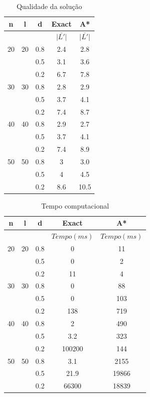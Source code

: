 \documentclass[12pt]{article}
\begin{document}
		\begin{multicols}{2}
			\begin {table}[H]
				\begin{tabular}{c|c|c|c|c} \hline
					n & l & d & Exact & A* \\ \hline
					& & & $\bar{|L'|}$ & $\bar{|L'|}$ \\ \hline
					20 & 20 & 0.8 & 2.4 & 2.8\\
					 &  & 0.5 & 3.1 & 3.6\\
					 &  & 0.2 & 6.7 & 7.8\\ \hline
					30 & 30 & 0.8 & 2.8 & 2.9 \\
					 &  & 0.5 & 3.7 & 4.1\\
					 &  & 0.2 & 7.4 & 8.7\\ \hline
					40 & 40 & 0.8 & 2.9 & 2.7\\
					 &  & 0.5 & 3.7 & 4.1\\
					 &  & 0.2 & 7.4 & 8.9\\ \hline
					50 & 50 & 0.8 & 3 & 3.0\\
					 &  & 0.5 & 4 & 4.5\\
					 &  & 0.2 & 8.6 & 10.5\\ \hline
				
				\end{tabular}
				\caption {Qualidade da solução}
			\end {table}
			
			\begin {table}[H]
	
				\begin{tabular}{c|c|c|c|c} \hline
					n & l & d & Exact & A* \\ \hline
					& & & $Tempo(ms)$ & $Tempo(ms)$\\ \hline
					20 & 20 & 0.8 &  0 & 11\\
					   &    & 0.5 &  0 & 2\\
					   &    & 0.2 & 11 & 4\\ \hline
					30 & 30 & 0.8 &  0 & 88 \\
					   &    & 0.5 &  0 & 103\\
					   &    & 0.2 & 138 & 719\\ \hline
					40 & 40 & 0.8 &  2 & 490\\
					   &    & 0.5 & 3.2 & 323\\
					   &    & 0.2 & 100200 & 144\\ \hline
					50 & 50 & 0.8 & 3.1 & 2155\\
					   &    & 0.5 & 21.9 & 19866\\
					   &    & 0.2 & 66300 & 18839\\ \hline
				\end{tabular}
				\caption {Tempo computacional}
			\end {table}



\end{multicols}
\end{document}
